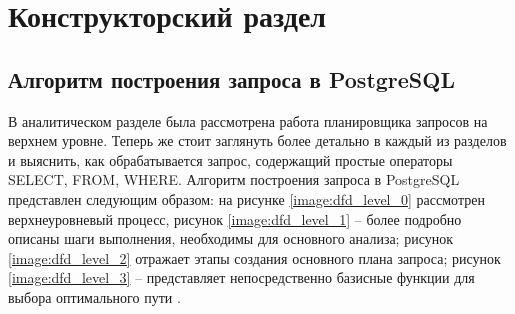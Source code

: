 \chapter{Конструкторский раздел}
\section{Алгоритм построения запроса в PostgreSQL}
В аналитическом разделе была рассмотрена работа планировщика запросов на верхнем уровне. Теперь же стоит заглянуть более детально в каждый из разделов и выяснить, как обрабатывается запрос, содержащий простые операторы SELECT, FROM, WHERE. Алгоритм построения запроса в PostgreSQL представлен следующим образом: на \newline рисунке \ref{image:dfd_level_0} рассмотрен верхнеуровневый процесс, рисунок  \ref{image:dfd_level_1} -- более подробно описаны шаги выполнения, необходимы для основного анализа; рисунок \ref{image:dfd_level_2} отражает этапы создания основного плана запроса; рисунок \ref{image:dfd_level_3} -- представляет непосредственно базисные функции для выбора оптимального пути \cite{source_code_postgresql, help_understanding_code}.

\begin{figure}[H]
\end{figure}

\begin{figure}[htb]
	\hfill
	\hfill
	\hfill\strut
	\hfill\strut
\end{figure}